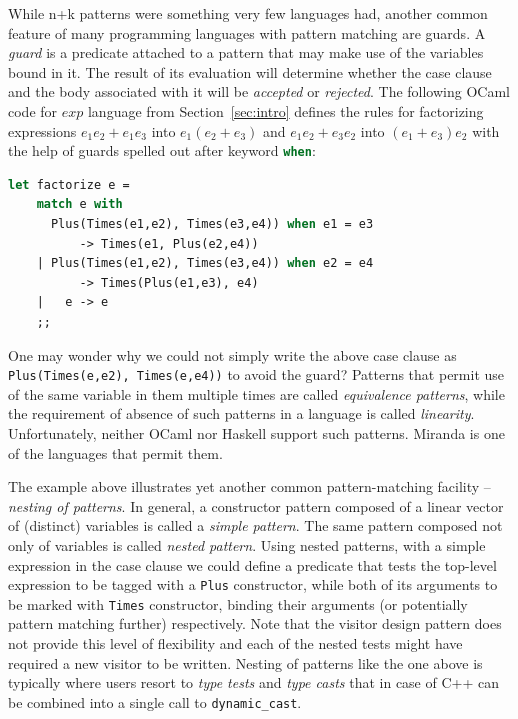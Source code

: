 \documentclass[preprint]{sigplanconf}
\makeatletter
\DeclareRobustCommand{\code}[1]{{\lstinline[breaklines=false,escapechar=@]{#1}}}
\DeclareRobustCommand{\codeocaml}[1]{{\lstinline[breaklines=false,language=Caml]{#1}}}
\makeatother
\begin{document}
While n+k patterns were something very few languages had, another common feature of 
many programming languages with pattern matching are guards. A \emph{guard} 
is a predicate attached to a pattern that may make use of the variables bound in 
it. The result of its evaluation will determine whether the case clause and the 
body associated with it will be \emph{accepted} or \emph{rejected}. The 
following OCaml code for $exp$ language from Section~\ref{sec:intro} defines the 
rules for factorizing expressions $e_1e_2+e_1e_3$ into $e_1(e_2+e_3)$ and 
$e_1e_2+e_3e_2$ into $(e_1+e_3)e_2$ with the help of guards spelled out after 
keyword \codeocaml{when}:

\begin{lstlisting}[language=Caml,keepspaces,columns=flexible]
let factorize e =
    match e with
      Plus(Times(e1,e2), Times(e3,e4)) when e1 = e3 
          -> Times(e1, Plus(e2,e4))
    | Plus(Times(e1,e2), Times(e3,e4)) when e2 = e4 
          -> Times(Plus(e1,e3), e4)
    |   e -> e
    ;;
\end{lstlisting}

One may wonder why we could not simply write the above case clause as 
\codeocaml{Plus(Times(e,e2), Times(e,e4))} to avoid the guard? Patterns that 
permit use of the same variable in them multiple times are called 
\emph{equivalence patterns}, while the requirement of absence of such patterns 
in a language is called \emph{linearity}. Unfortunately, neither OCaml nor 
Haskell support such patterns. Miranda\cite{Miranda85} is one of the languages 
that permit them. 

The example above illustrates yet another common pattern-matching facility -- 
\emph{nesting of patterns}. In general, a constructor pattern composed of a 
linear vector of (distinct) variables is called a \emph{simple pattern}. The 
same pattern composed not only of variables is called \emph{nested pattern}.
Using nested patterns, with a simple expression in the case clause we could
define a predicate that tests the top-level expression to be tagged with a
\codeocaml{Plus} constructor, while both of its arguments to be marked with 
\codeocaml{Times} constructor, binding their arguments (or potentially pattern 
matching further) respectively. Note that the visitor design pattern does not 
provide this level of flexibility and each of the nested tests might have 
required a new visitor to be written. Nesting of patterns like the one above is 
typically where users resort to \emph{type tests} and \emph{type casts} that in 
case of C++ can be combined into a single call to \code{dynamic_cast}.
\end{document}
